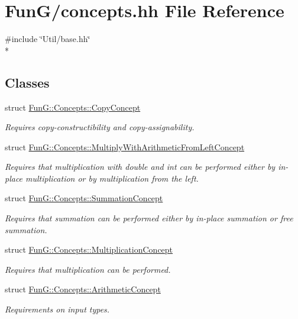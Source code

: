 \hypertarget{concepts_8hh}{\section{Fun\-G/concepts.hh File Reference}
\label{concepts_8hh}
}
{\ttfamily \#include \char`\"{}Util/base.\-hh\char`\"{}}\\*
\subsection*{Classes}
\begin{DoxyCompactItemize}
\item 
struct \hyperlink{structFunG_1_1Concepts_1_1CopyConcept}{Fun\-G\-::\-Concepts\-::\-Copy\-Concept}
\begin{DoxyCompactList}\small\item\em Requires copy-\/constructibility and copy-\/assignability. \end{DoxyCompactList}\item 
struct \hyperlink{structFunG_1_1Concepts_1_1MultiplyWithArithmeticFromLeftConcept}{Fun\-G\-::\-Concepts\-::\-Multiply\-With\-Arithmetic\-From\-Left\-Concept}
\begin{DoxyCompactList}\small\item\em Requires that multiplication with double and int can be performed either by in-\/place multiplication or by multiplication from the left. \end{DoxyCompactList}\item 
struct \hyperlink{structFunG_1_1Concepts_1_1SummationConcept}{Fun\-G\-::\-Concepts\-::\-Summation\-Concept}
\begin{DoxyCompactList}\small\item\em Requires that summation can be performed either by in-\/place summation or free summation. \end{DoxyCompactList}\item 
struct \hyperlink{structFunG_1_1Concepts_1_1MultiplicationConcept}{Fun\-G\-::\-Concepts\-::\-Multiplication\-Concept}
\begin{DoxyCompactList}\small\item\em Requires that multiplication can be performed. \end{DoxyCompactList}\item 
struct \hyperlink{structFunG_1_1Concepts_1_1ArithmeticConcept}{Fun\-G\-::\-Concepts\-::\-Arithmetic\-Concept}
\begin{DoxyCompactList}\small\item\em Requirements on input types. \end{DoxyCompactList}\item 

\end{DoxyCompactItemize}

